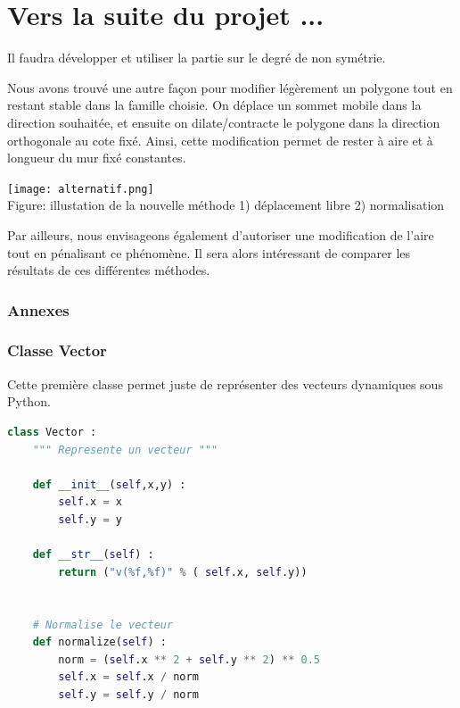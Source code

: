 \documentclass[a4paper,reqno]{article}
\newcommand{\pa}{\hspace{0.5cm}}
\begin{document}
\newpage
\part{Vers la suite du projet ...}
\pa 

Il faudra développer et utiliser la partie sur le degré de non symétrie.

Nous avons trouvé une autre façon pour modifier légèrement un polygone tout en restant stable dans la famille choisie. On déplace un sommet mobile dans la direction souhaitée, et ensuite on dilate/contracte le polygone dans la direction orthogonale au cote fixé. Ainsi, cette modification permet de rester à aire et à longueur du mur fixé constantes.
\begin{center}
	\texttt{[image: alternatif.png]}
	\\ Figure: illustation de la nouvelle méthode 1) déplacement libre 2) normalisation
\end{center}
Par ailleurs, nous envisageons également d'autoriser une modification de l'aire tout en pénalisant ce phénomène. 
Il sera alors intéressant de comparer les résultats de ces différentes méthodes.


\newpage

\pa 






\section*{Annexes}


\section*{Classe Vector}

Cette première classe permet juste de représenter des vecteurs dynamiques sous Python.


\begin{lstlisting}[language=Python,frame=single,caption=Création de la classe Vecteur]
class Vector : 
    """ Represente un vecteur """
    
    def __init__(self,x,y) : 
        self.x = x 
        self.y = y 
        
    def __str__(self) : 
        return ("v(%f,%f)" % ( self.x, self.y))
        
        
    # Normalise le vecteur 
    def normalize(self) : 
        norm = (self.x ** 2 + self.y ** 2) ** 0.5
        self.x = self.x / norm 
        self.y = self.y / norm 
\end{lstlisting}
\end{document}
